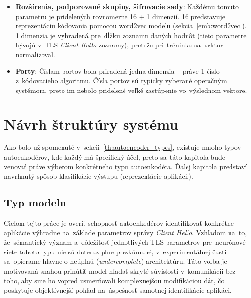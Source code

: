 \begin{itemize}
    Funkcia pre~vyjadrenie entropie sa~dá zapísať nasledovne:
    \begin{equation}
        H(X) = - \sum_{i=1}^{n} P(x_i) \log_2 P(x_i)
    \end{equation}
    $P(x_i)$ reprezentuje pravdepodobnosť, že~sa znak bude v~SNI nachádzať (počet výskytov konkrétneho znaku z~počtu všetkých znakov). To znanmená, že~SNI, ktoré obsahuje veľa znakov, ktoré sa v~ňom opakujú, bude vykazovať nízku hodnotu entropie, práve vďaka nízkej hodnote logaritmu. Naopak, SNI zložené z~veľkého množstva unikátnych znakov bez jasného vzoru bude mať vysokú hodnotu entropie.

    \item \textbf{Rozšírenia, podporované skupiny, šifrovacie sady}: 
    Každému tomuto parametru je pridelených rovnomerne 16 + 1 dimenzií. 16 predstavuje reprezentáciu kódovania pomocou word2vec modelu (sekcia~\ref{emb:word2vec}). 1 dimenzia je vyhradená pre~dĺžku zoznamu daných hodnôt (tieto parametre bývajú v~TLS \textit{Client Hello} zoznamy), pretože pri~tréninku sa~vektor normalizoval. 
    
    \item \textbf{Porty}: Číslam portov bola priradená jedna dimenzia -- práve 1 číslo z~kódovacieho algoritmu. Čísla portov sú typicky vyberané operačným systémom, preto im nebolo pridelené veľké zastúpenie vo~výslednom vektore.
\end{itemize}

\chapter{Návrh štruktúry systému}\label{design}
Ako bolo už spomenuté v~sekcii~\ref{th:autoencoder_types}, existuje mnoho typov autoenkodérov, kde každý má špecifický účel, preto sa~táto kapitola bude venovať práve výberom konkrétneho typu autoenkodéra. Ďalej kapitola predstaví navrhnutý spôsob klasifikácie výstupu (reprezentácie aplikácií). 

\section{Typ modelu}
Cieľom tejto práce je overiť schopnosť autoenkodérov identifikovať konkrétne aplikácie výhradne na~základe parametrov správy \textit{Client Hello}. Vzhľadom na~to, že~sémantický význam a~dôležitosť jednotlivých TLS parametrov pre~neurónové siete tohoto typu nie sú doteraz plne preskúmané, v~experimentálnej časti sa~opierame hlavne o neúplnú (\textit{undercomplete}) architektúru. Táto voľba je motivovaná snahou prinútiť model hľadať skryté súvislosti v~komunikácii bez toho, aby sme ho vopred usmerňovali komplexnejšou modifikáciou dát, čo poskytuje objektívnejší pohľad na~úspešnosť samotnej identifikácie aplikáci.

